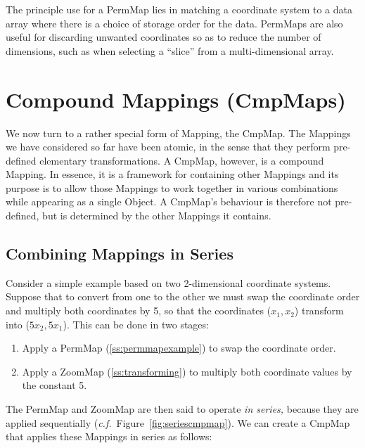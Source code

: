 \documentclass[twoside,11pt]{article}
\newcommand{\secref}[1]{\S\ref{#1}}
\renewcommand{\secref}[1]{\ref{#1}}
\begin{document}
The principle use for a PermMap lies in matching a coordinate system
to a data array where there is a choice of storage order for the data.
PermMaps are also useful for discarding unwanted coordinates so as to
reduce the number of dimensions, such as when selecting a ``slice''
from a multi-dimensional array.

\cleardoublepage
\section{\label{ss:cmpmaps}Compound Mappings (CmpMaps)}

We now turn to a rather special form of Mapping, the CmpMap. The
Mappings we have considered so far have been atomic, in the sense that
they perform pre-defined elementary transformations. A CmpMap,
however, is a compound Mapping. In essence, it is a framework for
containing other Mappings and its purpose is to allow those Mappings
to work together in various combinations while appearing as a single
Object. A CmpMap's behaviour is therefore not pre-defined, but is
determined by the other Mappings it contains.

\subsection{\label{ss:seriescmpmap}Combining Mappings in Series}

Consider a simple example based on two 2-dimensional coordinate
systems. Suppose that to convert from one to the other we must swap
the coordinate order and multiply both coordinates by 5, so that the
coordinates ($x_1,x_2$) transform into ($5x_2,5x_1$). This can be done
in two stages:

\begin{enumerate}
\item Apply a PermMap (\secref{ss:permmapexample}) to swap the
coordinate order.

\item Apply a ZoomMap (\secref{ss:transforming}) to multiply both
coordinate values by the constant 5.
\end{enumerate}

The PermMap and ZoomMap are then said to operate {\em{in series,}}
because they are applied sequentially
({\em{c.f.}}\ Figure~\ref{fig:seriescmpmap}).  We can create a CmpMap
that applies these Mappings in series as follows:
\end{document}
